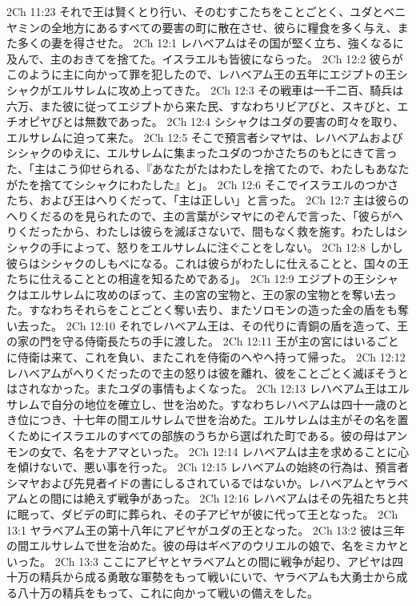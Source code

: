 2Ch 11:23  それで王は賢くとり行い、そのむすこたちをことごとく、ユダとベニヤミンの全地方にあるすべての要害の町に散在させ、彼らに糧食を多く与え、また多くの妻を得させた。
2Ch 12:1  レハベアムはその国が堅く立ち、強くなるに及んで、主のおきてを捨てた。イスラエルも皆彼にならった。
2Ch 12:2  彼らがこのように主に向かって罪を犯したので、レハベアム王の五年にエジプトの王シシャクがエルサレムに攻め上ってきた。
2Ch 12:3  その戦車は一千二百、騎兵は六万、また彼に従ってエジプトから来た民、すなわちリビアびと、スキびと、エチオピヤびとは無数であった。
2Ch 12:4  シシャクはユダの要害の町々を取り、エルサレムに迫って来た。
2Ch 12:5  そこで預言者シマヤは、レハベアムおよびシシャクのゆえに、エルサレムに集まったユダのつかさたちのもとにきて言った、「主はこう仰せられる、『あなたがたはわたしを捨てたので、わたしもあなたがたを捨ててシシャクにわたした』と」。
2Ch 12:6  そこでイスラエルのつかさたち、および王はへりくだって、「主は正しい」と言った。
2Ch 12:7  主は彼らのへりくだるのを見られたので、主の言葉がシマヤにのぞんで言った、「彼らがへりくだったから、わたしは彼らを滅ぼさないで、間もなく救を施す。わたしはシシャクの手によって、怒りをエルサレムに注ぐことをしない。
2Ch 12:8  しかし彼らはシシャクのしもべになる。これは彼らがわたしに仕えることと、国々の王たちに仕えることとの相違を知るためである」。
2Ch 12:9  エジプトの王シシャクはエルサレムに攻めのぼって、主の宮の宝物と、王の家の宝物とを奪い去った。すなわちそれらをことごとく奪い去り、またソロモンの造った金の盾をも奪い去った。
2Ch 12:10  それでレハベアム王は、その代りに青銅の盾を造って、王の家の門を守る侍衛長たちの手に渡した。
2Ch 12:11  王が主の宮にはいるごとに侍衛は来て、これを負い、またこれを侍衛のへやへ持って帰った。
2Ch 12:12  レハベアムがへりくだったので主の怒りは彼を離れ、彼をことごとく滅ぼそうとはされなかった。またユダの事情もよくなった。
2Ch 12:13  レハベアム王はエルサレムで自分の地位を確立し、世を治めた。すなわちレハベアムは四十一歳のとき位につき、十七年の間エルサレムで世を治めた。エルサレムは主がその名を置くためにイスラエルのすべての部族のうちから選ばれた町である。彼の母はアンモンの女で、名をナアマといった。
2Ch 12:14  レハベアムは主を求めることに心を傾けないで、悪い事を行った。
2Ch 12:15  レハベアムの始終の行為は、預言者シマヤおよび先見者イドの書にしるされているではないか。レハベアムとヤラベアムとの間には絶えず戦争があった。
2Ch 12:16  レハベアムはその先祖たちと共に眠って、ダビデの町に葬られ、その子アビヤが彼に代って王となった。
2Ch 13:1  ヤラベアム王の第十八年にアビヤがユダの王となった。
2Ch 13:2  彼は三年の間エルサレムで世を治めた。彼の母はギベアのウリエルの娘で、名をミカヤといった。
2Ch 13:3  ここにアビヤとヤラベアムとの間に戦争が起り、アビヤは四十万の精兵から成る勇敢な軍勢をもって戦いにいで、ヤラベアムも大勇士から成る八十万の精兵をもって、これに向かって戦いの備えをした。
